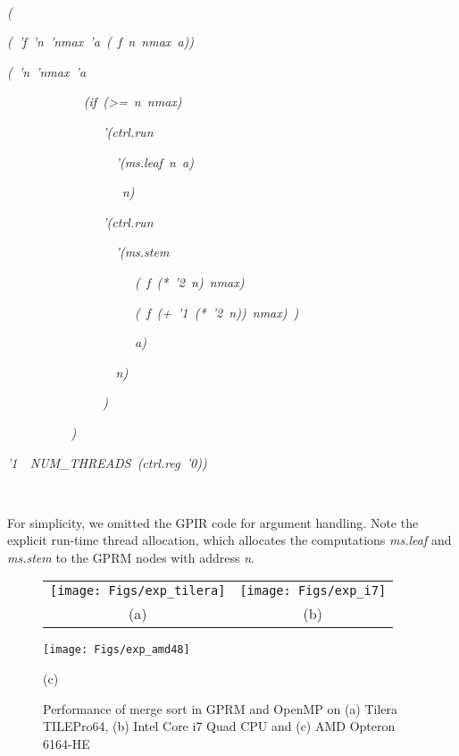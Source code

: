 \documentclass[copyright,creativecommons]{eptcs}
\providecommand{\tabularnewline}{\\}
\newenvironment{lyxcode}
{\par\begin{list}{}{
\setlength{\rightmargin}{\leftmargin}
\setlength{\listparindent}{0pt}\raggedright
\setlength{\itemsep}{0pt}
\setlength{\parsep}{0pt}
\normalfont\ttfamily}\item[]}
{\end{list}}
\begin{document}
~
\begin{lyxcode}
\textrm{\textit{(~}}

\textrm{\textit{	(~'f~'n~'nmax~'a~(~f~n~nmax~a))~}}

\textrm{\textit{	(~'n~'nmax~'a~~~~~~~~~~~~~}}

\textrm{\textit{~~~~~~~~~~~~(if~(>=~n~nmax)}}

\textrm{\textit{~~~~~~~~~~~~~~~'(ctrl.run~}}

\textrm{\textit{~~~~~~~~~~~~~~~~~'(ms.leaf~n~a)~~}}

\textrm{\textit{~~~~~~~~~~~~~~~~~~n)}}

\textrm{\textit{~~~~~~~~~~~~~~~'(ctrl.run~}}

\textrm{\textit{~~~~~~~~~~~~~~~~~'(ms.stem~}}

\textrm{\textit{~~~~~~~~~~~~~~~~~~~~(~f~({*}~'2~n)~nmax)}}

\textrm{\textit{~~~~~~~~~~~~~~~~~~~~(~f~(+~'1~({*}~'2~n))~nmax)~)~}}

\textrm{\textit{~~~~~~~~~~~~~~~~~~~~a)}}

\textrm{\textit{~~~~~~~~~~~~~~~~~n)}}~~~~~~~~~

\textrm{\textit{~~~~~~~~~~~~~~~)}}

\textrm{\textit{~~~~~~~~~~)}}

\textrm{\textit{'1~~NUM\_THREADS~(ctrl.reg~'0))}}

~
\end{lyxcode}
For simplicity, we omitted the GPIR code for argument handling. Note
the explicit run-time thread allocation, which allocates the computations
\emph{ms.leaf} and \emph{ms.stem} to the GPRM nodes with address \emph{n}. 

\begin{figure}[h]
\begin{centering}
{\footnotesize }\begin{tabular}{cc}
\texttt{[image: Figs/exp\_tilera]} & \texttt{[image: Figs/exp\_i7]}\tabularnewline
{\footnotesize (a)} & {\footnotesize (b)}\tabularnewline
\end{tabular}
\par\end{centering}{\footnotesize \par}

\noindent \begin{centering}
\texttt{[image: Figs/exp\_amd48]}
\par\end{centering}

\begin{centering}
{\footnotesize (c)}
\par\end{centering}{\footnotesize \par}

\caption{\label{fig:Performance-of-merge-1-1}Performance of merge sort in
GPRM and OpenMP on (a) Tilera TILEPro64, (b) Intel Core i7 Quad CPU
and (c) AMD Opteron 6164-HE}
\end{figure}
\end{document}
